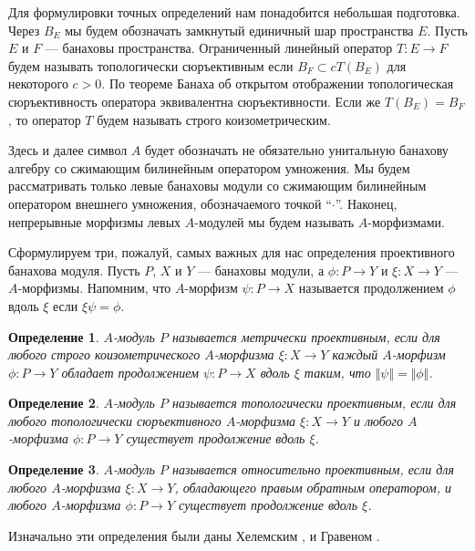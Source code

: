 \documentclass[12pt]{article}
\numberwithin{equation}{subsection}
\theoremstyle{plain}
\newtheorem{definition}{Определение}
\begin{document}
\begin{fulltext}
Для формулировки точных определений нам понадобится небольшая подготовка. Через $B_E$ мы будем обозначать замкнутый единичный шар пространства $E$. Пусть $E$ и $F$ --- банаховы пространства. Ограниченный линейный оператор $T:E\to F$ будем называть топологически сюръективным если $B_F\subset cT(B_E)$ для некоторого $c>0$. По теореме Банаха об открытом отображении топологическая сюръективность оператора эквивалентна сюръективности. Если же $T(B_E)=B_F$, то оператор $T$ будем называть строго коизометрическим. 

Здесь и далее символ $A$ будет обозначать не обязательно унитальную банахову алгебру со сжимающим билинейным оператором умножения. Мы будем рассматривать только левые банаховы модули со сжимающим билинейным оператором внешнего умножения, обозначаемого точкой ``$\cdot$''. Наконец, непрерывные морфизмы левых $A$-модулей мы будем называть $A$-морфизмами.

Сформулируем три, пожалуй, самых важных для нас определения проективного банахова модуля. Пусть $P$, $X$ и $Y$ --- банаховы модули, а $\phi:P\to Y$ и $\xi:X\to Y$ --- $A$-морфизмы. Напомним, что $A$-морфизм $\psi:P\to X$ называется продолжением $\phi$ вдоль $\xi$ если $\xi\psi=\phi$. 

\begin{definition}\label{MetProjMod} $A$-модуль $P$ называется метрически проективным, если для любого строго коизометрического $A$-морфизма $\xi:X\to Y$ каждый $A$-морфизм $\phi:P\to Y$ обладает продолжением $\psi:P\to X$ вдоль $\xi$ таким, что $\Vert\psi\Vert=\Vert\phi\Vert$.
\end{definition}

\begin{definition}\label{TopProjMod} $A$-модуль $P$ называется топологически проективным, если для любого топологически сюръективного $A$-морфизма $\xi:X\to Y$ и любого\newline 
$A$-морфизма $\phi:P\to Y$ существует продолжение вдоль $\xi$.
\end{definition}

\begin{definition}\label{RelProjMod} $A$-модуль $P$ называется относительно проективным, если \newline для любого $A$-морфизма $\xi:X\to Y$, обладающего правым обратным оператором, и любого $A$-морфизма $\phi:P\to Y$ существует продолжение вдоль $\xi$.
\end{definition}

Изначально эти определения были даны Хелемским \cite{HelemHomolDimNorModBanAlg}, \cite{HelMetrFrQMod} и Гравеном \cite{GravInjProjBanMod}.


\end{fulltext}
\end{document}
